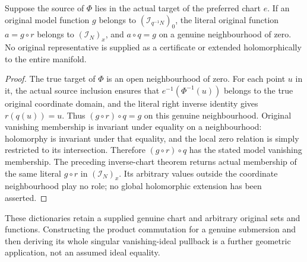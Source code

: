 \begin{lemma}
\label{hir:actual-singular-chart-original-function-representative}
\leanok
Suppose the source of $\Phi$ lies in the actual target of the preferred
chart $e$. If an original model function $g$ belongs to
$(\mathcal I_{q^{-1}N})_0$, the literal original function $a=g\circ r$
belongs to $(\mathcal I_N)_x$, and $a\circ q=g$ on a genuine
neighbourhood of zero. No original representative is supplied as a
certificate or extended holomorphically to the entire manifold.
\end{lemma}
\begin{proof}
The true target of $\Phi$ is an open neighbourhood of zero. For each
point $u$ in it, the actual source inclusion ensures that
$e^{-1}(\Phi^{-1}(u))$ belongs to the true original coordinate domain,
and the literal right inverse identity gives $r(q(u))=u$.
Thus $(g\circ r)\circ q=g$ on this genuine neighbourhood.
Original vanishing membership is invariant under equality on a
neighbourhood: holomorphy is invariant under that equality, and the
local zero relation is simply restricted to its intersection.
Therefore $(g\circ r)\circ q$ has the stated model vanishing membership.
The preceding inverse-chart theorem returns actual membership of the
same literal $g\circ r$ in $(\mathcal I_N)_x$. Its arbitrary values
outside the coordinate neighbourhood play no role; no global
holomorphic extension has been asserted.
\end{proof}

These dictionaries retain a supplied genuine chart and arbitrary original
sets and functions. Constructing the product commutation for a genuine
submersion and then deriving its whole singular vanishing-ideal pullback
is a further geometric application, not an assumed ideal equality.
